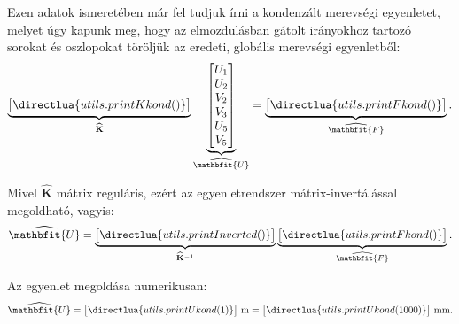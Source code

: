 \documentclass[a4paper, 12pt]{scrartcl}
\newcommand{\rvec}[1]{\mathbfit{#1}}
\newcommand{\rmat}[1]{\mathbf{#1}}
\begin{document}
Ezen adatok ismeretében már fel tudjuk írni a kondenzált merevségi egyenletet,
melyet úgy kapunk meg, hogy az elmozdulásban gátolt irányokhoz tartozó sorokat
és oszlopokat töröljük az eredeti, globális merevségi egyenletből:
\begin{equation}
  \underbrace{\begin{bmatrix}
      \directlua{utils.printKkond()}
    \end{bmatrix}}_{\widehat{\rmat K}}
  \underbrace{\begin{bmatrix}
      U_1 \\ U_2 \\ V_2 \\ V_3 \\ U_5 \\ V_5
    \end{bmatrix}}_{\widehat{\rvec U}}
  =
  \sisetup{
    exponent-mode = fixed,
    round-precision = 3
  }
  \underbrace{\begin{bmatrix}
      \directlua{utils.printFkond()}
    \end{bmatrix}}_{\widehat{\rvec F}}
  .
  \label{eq:cond}
\end{equation}

Mivel $\widehat{\rmat K}$ mátrix reguláris, ezért az egyenletrendszer
mátrix-invertálással megoldható, vagyis:
\begin{equation}
  \widehat{\rvec U} =
  \underbrace{\begin{bmatrix}
      \directlua{utils.printInverted()}
    \end{bmatrix}}_{\widehat{\rmat K}^{-1}}
  \sisetup{
    exponent-mode = fixed,
    round-precision = 3
  }
  \underbrace{\begin{bmatrix}
      \directlua{utils.printFkond()}
    \end{bmatrix}}_{\widehat{\rvec F}}
  .
  \label{eq:inverted}
\end{equation}

Az egyenlet megoldása numerikusan:
\begin{equation}
  \widehat{\rvec U} = \begin{bmatrix}
    \directlua{utils.printUkond(1)}
  \end{bmatrix} \, \mathrm{m}
  =
  \sisetup{exponent-mode = fixed}
  \begin{bmatrix}
    \directlua{utils.printUkond(1000)}
  \end{bmatrix} \, \mathrm{mm}.
  \label{eq:numericCond}
\end{equation}
\end{document}
